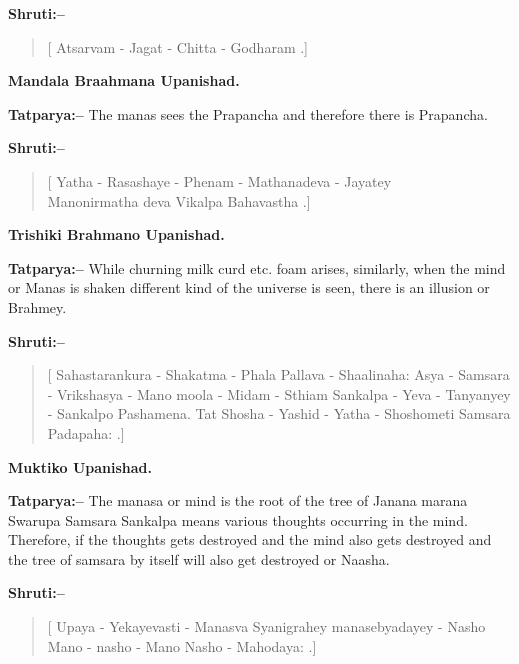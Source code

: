 \textbf{Shruti:–}

\begin{verse}
[ Atsarvam - Jagat - Chitta - Godharam .]
\end{verse}

\begin{flushright}
\textbf{Mandala Braahmana Upanishad.}
\end{flushright}

\textbf{Tatparya:–} The manas sees the Prapancha and therefore there is Prapancha.

\textbf{Shruti:–}

\begin{verse}
[ Yatha - Rasashaye - Phenam - Mathanadeva - Jayatey \\ Manonirmatha deva Vikalpa Bahavastha .]
\end{verse}

\begin{flushright}
\textbf{Trishiki Brahmano Upanishad.}
\end{flushright}

\textbf{Tatparya:–} While churning milk curd etc. foam arises, similarly, when the mind or Manas is shaken different kind of the universe is seen, there is an illusion or Brahmey.

\textbf{Shruti:–}

\begin{verse}
[ Sahastarankura - Shakatma - Phala Pallava - Shaali\break naha:  Asya - Samsara - Vrikshasya - Mano moola - Midam - Sthiam  Sankalpa - Yeva - Tanyanyey - Sankalpo Pashamena. Tat Shosha - Yashid - Yatha - Shoshometi Samsara Padapaha: .]
\end{verse}

\begin{flushright}
\textbf{Muktiko Upanishad.}
\end{flushright}

\textbf{Tatparya:–} The manasa or mind is the root of the tree of Janana marana Swarupa Samsara  Sankalpa means various thoughts occurring in the mind. Therefore, if the thoughts gets destroyed and the mind also gets destroyed and the tree of samsara by itself will also get destroyed or Naasha.

\textbf{Shruti:–}

\begin{verse}
[ Upaya - Yekayevasti - Manasva Syanigrahey manasebyadayey - Nasho Mano - nasho - Mano Nasho - Mahodaya: .]
\end{verse}

